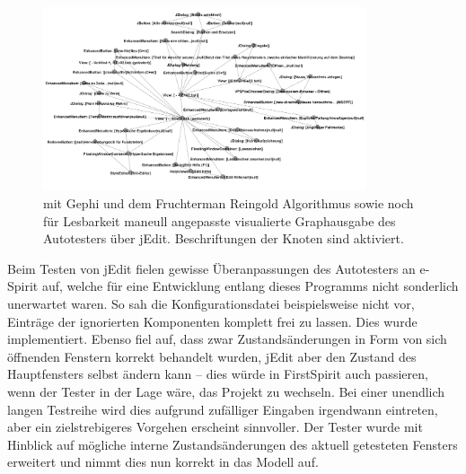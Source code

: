 \begin{figure}
	\centering
	\includegraphics[width=0.85\textwidth]{bilder/model_jedit.png}
	\caption{mit Gephi und dem Fruchterman Reingold Algorithmus\cite{SPE:SPE4380211102}
    sowie noch für Lesbarkeit maneull angepasste visualierte Graphausgabe 
	des Autotesters über jEdit. Beschriftungen der Knoten sind aktiviert.}
	\label{fig:model_jedit}
\end{figure}


Beim Testen von jEdit fielen gewisse Überanpassungen des Autotesters an e-Spirit auf,
welche für eine Entwicklung entlang dieses Programms nicht sonderlich unerwartet
waren. So sah die Konfigurationsdatei beispielsweise nicht vor, Einträge der 
ignorierten Komponenten komplett frei zu lassen. Dies wurde implementiert.
Ebenso fiel auf, dass zwar Zustandsänderungen in Form von sich öffnenden Fenstern
korrekt behandelt wurden, jEdit aber den Zustand des Hauptfensters selbst
ändern kann -- dies würde in FirstSpirit auch passieren, wenn der Tester in der
Lage wäre, das Projekt zu wechseln. Bei einer unendlich langen Testreihe
wird dies aufgrund zufälliger Eingaben irgendwann eintreten, 
aber ein zielstrebigeres Vorgehen erscheint sinnvoller.
Der Tester wurde mit Hinblick auf mögliche interne Zustandsänderungen
des aktuell getesteten Fensters erweitert und nimmt dies nun korrekt in
das Modell auf.

